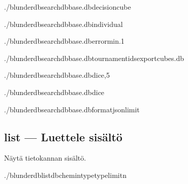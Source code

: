 \documentclass[letterpaper,10pt,finnish]{sphinxmanual}
\begin{document}
\sphinxAtStartPar
{}

\begin{sphinxVerbatim}[commandchars=\\\{\}]
./blunderdbsearch\PYGZhy{}\PYGZhy{}dbbase.db\PYGZhy{}\PYGZhy{}decisioncube

./blunderdbsearch\PYGZhy{}\PYGZhy{}dbbase.db\PYGZhy{}\PYGZhy{}individual

./blunderdbsearch\PYGZhy{}\PYGZhy{}dbbase.db\PYGZhy{}\PYGZhy{}error\PYGZhy{}min.1

./blunderdbsearch\PYGZhy{}\PYGZhy{}dbbase.db\PYGZhy{}\PYGZhy{}tournament\PYGZhy{}ids\PYGZhy{}\PYGZhy{}exportcubes.db

./blunderdbsearch\PYGZhy{}\PYGZhy{}dbbase.db\PYGZhy{}\PYGZhy{}dice,5

./blunderdbsearch\PYGZhy{}\PYGZhy{}dbbase.db\PYGZhy{}\PYGZhy{}dice

./blunderdbsearch\PYGZhy{}\PYGZhy{}dbbase.db\PYGZhy{}\PYGZhy{}formatjson\PYGZhy{}\PYGZhy{}limit
\end{sphinxVerbatim}


\subsection{list — Luettele sisältö}
\label{\detokenize{cli:list-lister-le-contenu}}
\sphinxAtStartPar
Näytä tietokannan sisältö.

\begin{sphinxVerbatim}[commandchars=\\\{\}]
./blunderdblist\PYGZhy{}\PYGZhy{}db\PYGZlt{}chemin\PYGZgt{}\PYGZhy{}\PYGZhy{}type\PYGZlt{}type\PYGZgt{}\PYG{o}{[}\PYGZhy{}\PYGZhy{}limit\PYGZlt{}n\PYGZgt{}\PYG{o}{]}
\end{sphinxVerbatim}
\end{document}
